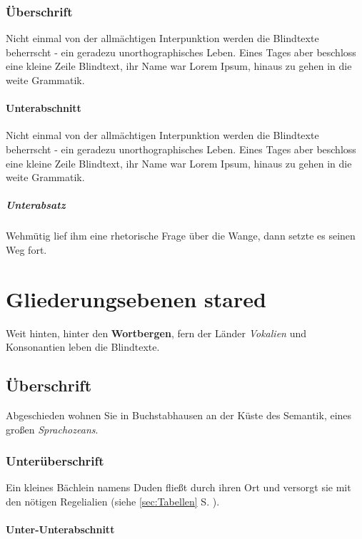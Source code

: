 \documentclass[%
	12pt,%
	a4paper,%
	oneside,%
	listof=totoc,
 	index=totoc,
	bibliography = totoc,
	parskip = half,%
	chapterprefix=false,%
	appendixprefix, %
	headings=small,%
]{scrreprt}
\begin{document}
\subsection{Überschrift}
Nicht einmal von der allmächtigen Interpunktion werden die Blindtexte beherrscht - ein geradezu unorthographisches Leben. Eines Tages aber beschloss eine kleine Zeile Blindtext, ihr Name war Lorem Ipsum, hinaus zu gehen in die weite Grammatik.

\subsubsection{Unterabschnitt}
Nicht einmal von der allmächtigen Interpunktion werden die Blindtexte beherrscht - ein geradezu unorthographisches Leben. Eines Tages aber beschloss eine kleine Zeile Blindtext, ihr Name war Lorem Ipsum, hinaus zu gehen in die weite Grammatik.

\paragraph{Unterabsatz}
Wehmütig lief ihm eine rhetorische Frage über die Wange, dann setzte es seinen Weg fort.
\chapter*{Gliederungsebenen stared}
\label{sec:Gliederung3}

Weit hinten, hinter den \textbf{Wortbergen}, fern der Länder \textit{Vokalien} und Konsonantien leben die Blindtexte.

\section*{Überschrift}

Abgeschieden wohnen Sie in Buchstabhausen an der Küste des Semantik, eines großen \textsl{Sprachozeans}.

\subsection*{Unterüberschrift}

Ein kleines Bächlein namens Duden fließt durch ihren Ort und versorgt sie mit den nötigen Regelialien (siehe \ref{sec:Tabellen} S. \pageref{sec:Tabellen}).

\subsubsection*{Unter-Unterabschnitt}
\end{document}
